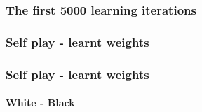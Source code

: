 \documentclass[10pt]{beamer}
\begin{document}
\begin{frame}
  \frametitle{The first 5000 learning iterations}
  \begin{center}  \end{center}
\end{frame}

\begin{frame}
  \frametitle{Self play - learnt weights}
  \begin{center}   \end{center} 
\end{frame}

\begin{frame}
  \frametitle{Self play - learnt weights}
  \framesubtitle{White - Black}
  \begin{center}   \end{center} 
\end{frame}
\end{document}
